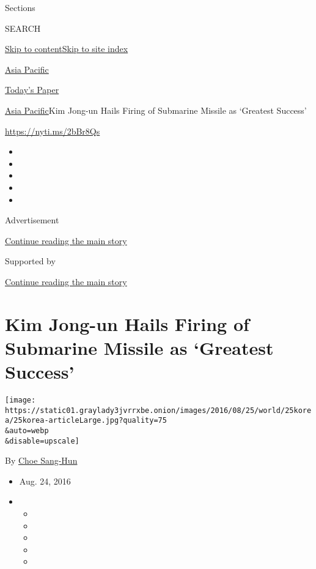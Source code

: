 Sections

SEARCH

\protect\hyperlink{site-content}{Skip to
content}\protect\hyperlink{site-index}{Skip to site index}

\href{https://www.nytimes3xbfgragh.onion/section/world/asia}{Asia
Pacific}

\href{https://myaccount.nytimes3xbfgragh.onion/auth/login?response_type=cookie\&client_id=vi}{}

\href{https://www.nytimes3xbfgragh.onion/section/todayspaper}{Today's
Paper}

\href{/section/world/asia}{Asia Pacific}\textbar{}Kim Jong-un Hails
Firing of Submarine Missile as `Greatest Success'

\url{https://nyti.ms/2bBr8Qs}

\begin{itemize}
\item
\item
\item
\item
\item
\end{itemize}

Advertisement

\protect\hyperlink{after-top}{Continue reading the main story}

Supported by

\protect\hyperlink{after-sponsor}{Continue reading the main story}

\hypertarget{kim-jong-un-hails-firing-of-submarine-missile-as-greatest-success}{%
\section{Kim Jong-un Hails Firing of Submarine Missile as `Greatest
Success'}\label{kim-jong-un-hails-firing-of-submarine-missile-as-greatest-success}}

\texttt{[image: https://static01.graylady3jvrrxbe.onion/images/2016/08/25/world/25korea/25korea-articleLarge.jpg?quality=75\\\&auto=webp\\\&disable=upscale]}

By \href{http://www.nytimes3xbfgragh.onion/by/choe-sang-hun}{Choe
Sang-Hun}

\begin{itemize}
\item
  Aug. 24, 2016
\item
  \begin{itemize}
  \item
  \item
  \item
  \item
  \item
  \end{itemize}
\end{itemize}

